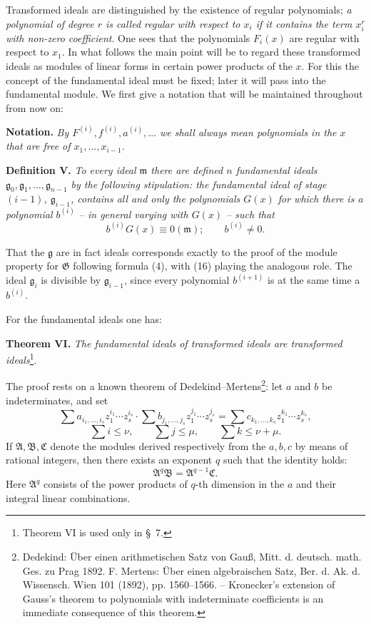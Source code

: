 \documentclass[11pt]{article}
\newcommand{\Amod}{\mathfrak A}
\newcommand{\Bmod}{\mathfrak B}
\newcommand{\Gmod}{\mathfrak G}
\newcommand{\mideal}{\mathfrak m}
\newcommand{\gideal}{\mathfrak g}
\newcommand{\zero}[1]{\equiv 0(#1)}
\begin{document}
Transformed ideals are distinguished by the existence of regular polynomials; \emph{a polynomial of degree $r$ is called regular with respect to $x_i$ if it contains the term $x_i^r$ with non-zero coefficient}. One sees that the polynomials $F_i(x)$ are regular with respect to $x_1$. In what follows the main point will be to regard these transformed ideals as modules of linear forms in certain power products of the $x$. For this the concept of the fundamental ideal must be fixed; later it will pass into the fundamental module. We first give a notation that will be maintained throughout from now on:

\medskip
\noindent\textbf{Notation.} \emph{By $F^{(i)},f^{(i)},a^{(i)},\ldots$ we shall always mean polynomials in the $x$ that are free of $x_1,\ldots,x_{i-1}$.}

\medskip
\noindent\textbf{Definition V.} \emph{To every ideal $\mideal$ there are defined $n$ fundamental ideals $\gideal_0,\gideal_1,\ldots,\gideal_{n-1}$ by the following stipulation: the fundamental ideal of stage $(i-1)$, $\gideal_{i-1}$, contains all and only the polynomials $G(x)$ for which there is a polynomial $b^{(i)}$ -- in general varying with $G(x)$ -- such that}
\begin{equation}
 b^{(i)}G(x)\zero{\mideal};\qquad b^{(i)}\ne0.
\tag{16}
\end{equation}

That the $\gideal$ are in fact ideals corresponds exactly to the proof of the module property for $\Gmod$ following formula (4), with (16) playing the analogous role. The ideal $\gideal_i$ is divisible by $\gideal_{i-1}$, since every polynomial $b^{(i+1)}$ is at the same time a $b^{(i)}$.

For the fundamental ideals one has:

\medskip
\noindent\textbf{Theorem VI.} \emph{The fundamental ideals of transformed ideals are transformed ideals}\footnote{Theorem VI is used only in §~7.}.

The proof rests on a known theorem of Dedekind--Mertens\footnote{Dedekind: Über einen arithmetischen Satz von Gauß, Mitt. d. deutsch. math. Ges. zu Prag 1892. F. Mertens: Über einen algebraischen Satz, Ber. d. Ak. d. Wissensch. Wien 101 (1892), pp. 1560--1566. -- Kronecker's extension of Gauss's theorem to polynomials with indeterminate coefficients is an immediate consequence of this theorem.}: let $a$ and $b$ be indeterminates, and set
\[
 \sum a_{i_1,\ldots,i_s}z_1^{i_1}\cdots z_s^{i_s}\cdot
 \sum b_{j_1,\ldots,j_s}z_1^{j_1}\cdots z_s^{j_s}
 =
 \sum c_{k_1,\ldots,k_s}z_1^{k_1}\cdots z_s^{k_s},
\]
\[
 \sum i\le \nu,
 \qquad
 \sum j\le \mu,
 \qquad
 \sum k\le \nu+\mu.
\]
If $\Amod,\Bmod,\mathfrak C$ denote the modules derived respectively from the $a,b,c$ by means of rational integers, then there exists an exponent $q$ such that the identity holds:
\begin{equation}
 \Amod^q\Bmod=\Amod^{q-1}\mathfrak C.
\tag{17}
\end{equation}
Here $\Amod^q$ consists of the power products of $q$-th dimension in the $a$ and their integral linear combinations.
\end{document}
